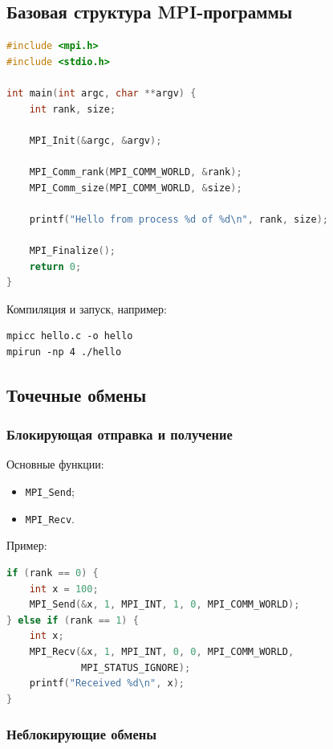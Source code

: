 \documentclass[12pt,a4paper]{article}
\begin{document}
\subsection{Базовая структура MPI-программы}

\begin{lstlisting}[language=C]
#include <mpi.h>
#include <stdio.h>

int main(int argc, char **argv) {
    int rank, size;

    MPI_Init(&argc, &argv);

    MPI_Comm_rank(MPI_COMM_WORLD, &rank);
    MPI_Comm_size(MPI_COMM_WORLD, &size);

    printf("Hello from process %d of %d\n", rank, size);

    MPI_Finalize();
    return 0;
}
\end{lstlisting}

Компиляция и запуск, например:

\begin{lstlisting}
mpicc hello.c -o hello
mpirun -np 4 ./hello
\end{lstlisting}

\subsection{Точечные обмены}

\subsubsection{Блокирующая отправка и получение}

Основные функции:
\begin{itemize}
    \item \texttt{MPI\_Send};
    \item \texttt{MPI\_Recv}.
\end{itemize}

Пример:

\begin{lstlisting}[language=C]
if (rank == 0) {
    int x = 100;
    MPI_Send(&x, 1, MPI_INT, 1, 0, MPI_COMM_WORLD);
} else if (rank == 1) {
    int x;
    MPI_Recv(&x, 1, MPI_INT, 0, 0, MPI_COMM_WORLD,
             MPI_STATUS_IGNORE);
    printf("Received %d\n", x);
}
\end{lstlisting}

\subsubsection{Неблокирующие обмены}
\end{document}
